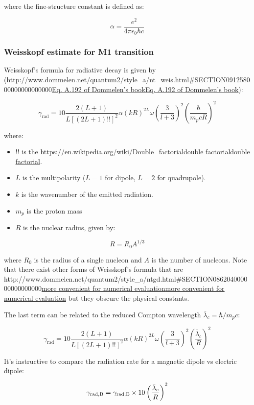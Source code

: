 \documentclass[
]{article}
\let\oldhref\href
\renewcommand{\href}[2]{\ifx#1\urlprefix\oldhref{#1}{#2}\else\uline{\oldhref{#1}{#2}}\fi}
\renewcommand{\[}{\begin{equation}}
\renewcommand{\]}{\end{equation}}
\providecommand{\tightlist}{%
  \setlength{\itemsep}{0pt}\setlength{\parskip}{0pt}}
\begin{document}
where the fine-structure constant is defined as:

\[
\alpha = \frac{e^2}{4\pi \epsilon_0 \hbar c}
\]

\subsubsection{Weisskopf estimate for M1
transition}\label{weisskopf-estimate-for-m1-transition}

Weisskopf's formula for radiative decay is given by
(\href{http://www.dommelen.net/quantum2/style_a/nt_weis.html\#SECTION091258000000000000000}{Eq.
A.192 of Dommelen's book}):

\[
\gamma_{\text{rad}}  =  10\frac{2(L+1)}{L [(2L+1)!!]^2} \alpha (kR)^{2L} \omega \left( \frac{3}{l+3} \right)^2 \left( \frac{\hbar}{m_p c R} \right)^2
\]

where:

\begin{itemize}
\tightlist
\item
  \(!!\) is the
  \href{https://en.wikipedia.org/wiki/Double_factorial}{double
  factorial}.
\item
  \(L\) is the multipolarity (\(L=1\) for dipole, \(L=2\) for
  quadrupole).
\item
  \(k\) is the wavenumber of the emitted radiation.
\item
  \(m_p\) is the proton mass
\item
  \(R\) is the nuclear radius, given by:
\end{itemize}

\[
R = R_0 A^{1/3}
\]

where \(R_0\) is the radius of a single nucleon and \(A\) is the number
of nucleons. Note that there exist other forms of Weisskopf's formula
that are
\href{http://www.dommelen.net/quantum2/style_a/ntgd.html\#SECTION086204000000000000000}{more
convenient for numerical evaluation} but they obscure the physical
constants.

The last term can be related to the reduced Compton wavelength
\(\bar\lambda_c = \hbar / m_p c\):

\[
\gamma_{\text{rad}}  =  10\frac{2(L+1)}{L [(2L+1)!!]^2} \alpha (kR)^{2L} \omega \left( \frac{3}{l+3} \right)^2 \left( \frac{\bar\lambda_c}{R} \right)^2
\]

It's instructive to compare the radiation rate for a magnetic dipole vs
electric dipole:

\[
\gamma_{\rm rad, B} = \gamma_{\rm rad, E} \times 10\left( \frac{\bar\lambda_c}{R} \right)^2
\]
\end{document}
